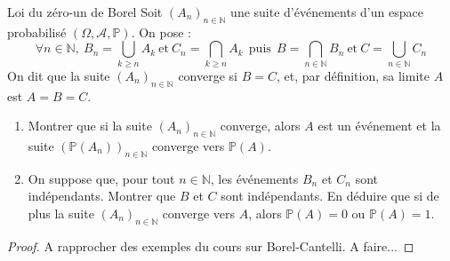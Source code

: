 \documentclass[french,a4paper]{article}
\renewcommand{\P}{\mathbb{P}}
\newcommand{\N}{\mathbb{N}}
\theoremstyle{plain}
\theoremstyle{definition}
\theoremstyle{remark}
\begin{document}
\begin{ex}[Moulin.31]{Loi du zéro-un de Borel}
	Soit $(A_n)_{n\in\N}$ une suite d'événements d'un espace probabilisé $(\Omega,\mathcal{A},\P)$. On pose : $$\forall n\in\N,\ B_n=\bigcup_{k\geqslant n}A_k \ \text{et} \ C_n=\bigcap_{k\geqslant n}A_k \ \ \text{puis}\ \ B=\bigcap_{n\in\N}B_n \ \text{et}\ C=\bigcup_{n\in\N}C_n$$ On dit que la suite $(A_n)_{n\in\N}$ converge si $B=C$, et, par définition, sa limite $A$ est $A=B=C$.
	\begin{enumerate}
		\item Montrer que si la suite $(A_n)_{n\in\N}$ converge, alors $A$ est un événement et la suite $(\P(A_n))_{n\in\N}$ converge vers $\P(A)$.
		\item On suppose que, pour tout $n\in\N$, les événements $B_n$ et $C_n$ sont indépendants. Montrer que $B$ et $C$ sont indépendants. En déduire que si de plus la suite $(A_n)_{n\in\N}$ converge vers $A$, alors $\P(A)=0$ ou $\P(A)=1$.
	\end{enumerate}
\end{ex}
\begin{proof}
	A rapprocher des exemples du cours sur Borel-Cantelli. A faire...
\end{proof}
\end{document}
